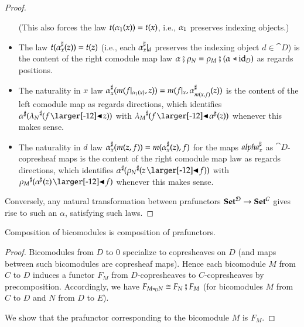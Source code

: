 \documentclass{amsart}
\begin{document}
\begin{proof}
\begin{itemize}
    (This also forces the law $t({\alpha}_1(x)) = t(x)$, i.e.,
    ${\alpha}_1$ preserves indexing objects.)
  \item The law $t({\alpha}^\sharp_{x}(z)) = t(z)$ (i.e., each
    ${\alpha}^\sharp_{x}|_{d}$ preserves the indexing object
    $d \in \cat{D}$) is the content of the right comodule map law
    $\alpha \fatsemi \rho_N = \rho_M \fatsemi (\alpha \mathrel{\triangleleft} \mathrm{id}_D)$ as
    regards positions.
  \item The naturality in $x$ law
    ${\alpha}^\sharp_{x}(m(f|_{{\alpha}_1(x)}, z)) =
    m(f|_{x}, {\alpha}^\sharp_{m(x, f)}(z))$ is the content of the
    left comodule map as regards directions, which identifies
    ${\anydirmapof{\alpha}{\anydirmapof{\lambda_N}{f \subd z}}}$ with
    $\anydirmapof{\lambda_M}{f \subd \anydirmapof{\alpha}{z}}$ whenever
    this makes sense.
  \item The naturality in $d$ law
    ${\alpha}^\sharp_{x}(m(z, f)) = m({\alpha}^\sharp_{x}(z), f)$
    for the maps ${alpha}^\sharp_{x}$ as $\cat{D}$-copresheaf maps is
    the content of the right comodule map law as regards directions,
    which identifies
    $\anydirmapof{\alpha}{\anydirmapof{\rho_N}{z \subd f}}$ with
    $\anydirmapof{\rho_M}{\anydirmapof{\alpha}{z} \subd f}$ whenever
    this makes sense.
  \end{itemize}

  Conversely, any natural transformation between prafunctors
  ${\normalfont\mathbf{Set}}^{\mathcal{D}} \to {\normalfont\mathbf{Set}}^{\mathcal{C}}$ gives rise to such an $\alpha$,
  satisfying such laws.
\end{proof}

\begin{prop}
  Composition of bicomodules is composition of prafunctors.
\end{prop}
\begin{proof}
  Bicomodules from $D$ to $0$ specialize to copresheaves on $D$ (and maps
  between such bicomodules are copresheaf maps). Hence each bicomodule
  $M$ from $C$ to $D$ induces a functor $F_M$ from $D$-copresheaves to
  $C$-copresheaves by precomposition. Accordingly, we have
  $F_{M \mathrel{\triangleleft}_D N} \cong F_N \fatsemi F_M$ (for bicomodules $M$ from
  $C$ to $D$ and $N$ from $D$ to $E$).
  
  We show that the prafunctor corresponding to the bicomodule $M$ is
  $F_M$.

  
\end{proof}
\end{document}
